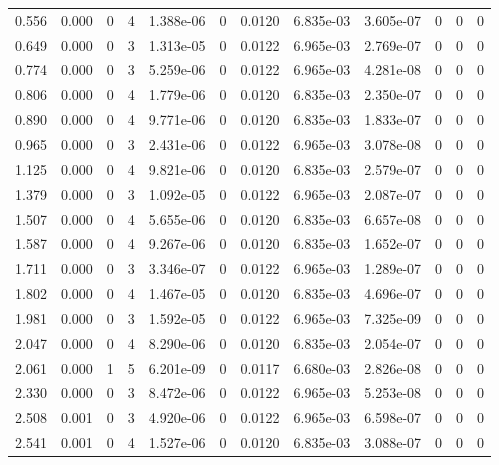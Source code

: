 \documentclass[preview]{standalone}
\begin{document}
{{\begin{tabular}{L{1.2cm}C{1.2cm} C{0.3cm}C{0.5cm} C{1.4cm}C{1.4cm} C{1.4cm}C{1.4cm} C{1.6cm}C{1.6cm} C{1.6cm}C{1.6cm}}
  0.556  &  0.000  & 0     &  4 &  1.388e-06  & 0  &  0.0120&   6.835e-03& 3.605e-07 & 0   &  0 & 0  \\ 
  0.649  &  0.000  & 0     &  3 &  1.313e-05  & 0  &  0.0122&   6.965e-03& 2.769e-07 & 0   &  0 & 0  \\ 
  0.774  &  0.000  & 0     &  3 &  5.259e-06  & 0  &  0.0122&   6.965e-03& 4.281e-08 & 0   &  0 & 0  \\ 
  0.806  &  0.000  & 0     &  4 &  1.779e-06  & 0  &  0.0120&   6.835e-03& 2.350e-07 & 0   &  0 & 0  \\ 
  0.890  &  0.000  & 0     &  4 &  9.771e-06  & 0  &  0.0120&   6.835e-03& 1.833e-07 & 0   &  0 & 0  \\ 
  0.965  &  0.000  & 0     &  3 &  2.431e-06  & 0  &  0.0122&   6.965e-03& 3.078e-08 & 0   &  0 & 0  \\ 
  1.125  &  0.000  & 0     &  4 &  9.821e-06  & 0  &  0.0120&   6.835e-03& 2.579e-07 & 0   &  0 & 0  \\ 
  1.379  &  0.000  & 0     &  3 &  1.092e-05  & 0  &  0.0122&   6.965e-03& 2.087e-07 & 0   &  0 & 0  \\ 
  1.507  &  0.000  & 0     &  4 &  5.655e-06  & 0  &  0.0120&   6.835e-03& 6.657e-08 & 0   &  0 & 0  \\ 
  1.587  &  0.000  & 0     &  4 &  9.267e-06  & 0  &  0.0120&   6.835e-03& 1.652e-07 & 0   &  0 & 0  \\ 
  1.711  &  0.000  & 0     &  3 &  3.346e-07  & 0  &  0.0122&   6.965e-03& 1.289e-07 & 0   &  0 & 0  \\ 
  1.802  &  0.000  & 0     &  4 &  1.467e-05  & 0  &  0.0120&   6.835e-03& 4.696e-07 & 0   &  0 & 0  \\ 
  1.981  &  0.000  & 0     &  3 &  1.592e-05  & 0  &  0.0122&   6.965e-03& 7.325e-09 & 0   &  0 & 0  \\ 
  2.047  &  0.000  & 0     &  4 &  8.290e-06  & 0  &  0.0120&   6.835e-03& 2.054e-07 & 0   &  0 & 0  \\ 
  2.061  &  0.000  & 1     &  5 &  6.201e-09  & 0  &  0.0117&   6.680e-03& 2.826e-08 & 0   &  0 & 0  \\ 
  2.330  &  0.000  & 0     &  3 &  8.472e-06  & 0  &  0.0122&   6.965e-03& 5.253e-08 & 0   &  0 & 0  \\ 
  2.508  &  0.001  & 0     &  3 &  4.920e-06  & 0  &  0.0122&   6.965e-03& 6.598e-07 & 0   &  0 & 0  \\ 
  2.541  &  0.001  & 0     &  4 &  1.527e-06  & 0  &  0.0120&   6.835e-03& 3.088e-07 & 0   &  0 & 0  \\ 

\end{tabular}}}
\end{document}
